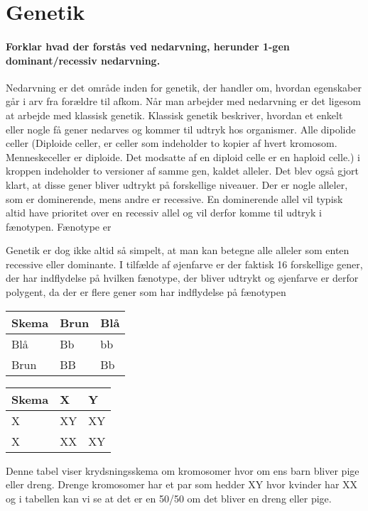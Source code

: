 \newpage
\part{Genetik}
\subsection*{Forklar hvad der forstås ved nedarvning, herunder 1-gen dominant/recessiv nedarvning.}
Nedarvning er det område inden for genetik, der handler om, hvordan egenskaber går i arv fra forældre til afkom. Når man arbejder med nedarvning er det ligesom at arbejde med klassisk genetik. Klassisk genetik beskriver, hvordan et enkelt eller nogle få gener nedarves og kommer til udtryk hos organismer. Alle dipolide celler (Diploide celler, er celler som indeholder to kopier af hvert kromosom. Menneskeceller er diploide. Det modsatte af en diploid celle er en haploid celle.) i kroppen indeholder to versioner af samme gen, kaldet alleler. Det blev også gjort klart, at disse gener bliver udtrykt på forskellige niveauer. Der er nogle alleler, som er dominerende, mens andre er recessive. En dominerende allel vil typisk altid have prioritet over en recessiv allel og vil derfor komme til udtryk i fænotypen. Fænotype er %

Genetik er dog ikke altid så simpelt, at man kan betegne alle alleler som enten recessive eller dominante. I tilfælde af øjenfarve er der faktisk 16 forskellige gener, der har indflydelse på hvilken fænotype, der bliver udtrykt og øjenfarve er derfor polygent, da der er flere gener som har indflydelse på fænotypen

\begin{longtable}{| m{3cm} | m{3cm} | m{3cm} |}
    \hline
    Skema & Brun & Blå \\ \hline
    Blå   & Bb   & bb   \\ \hline
    Brun  & BB   & Bb  \\ \hline
\end{longtable}

\begin{longtable}{| m{3cm} | m{3cm} | m{3cm} |}
    \hline
    Skema & X & Y \\ \hline
    X   & XY   & XY  \\ \hline
    X  & XX   & XY  \\ \hline
\end{longtable}
Denne tabel viser krydsningsskema om kromosomer hvor om ens barn bliver pige eller dreng. Drenge kromosomer har et par som hedder XY hvor kvinder har XX og i tabellen kan vi se at det er en 50/50 om det bliver en dreng eller pige.



